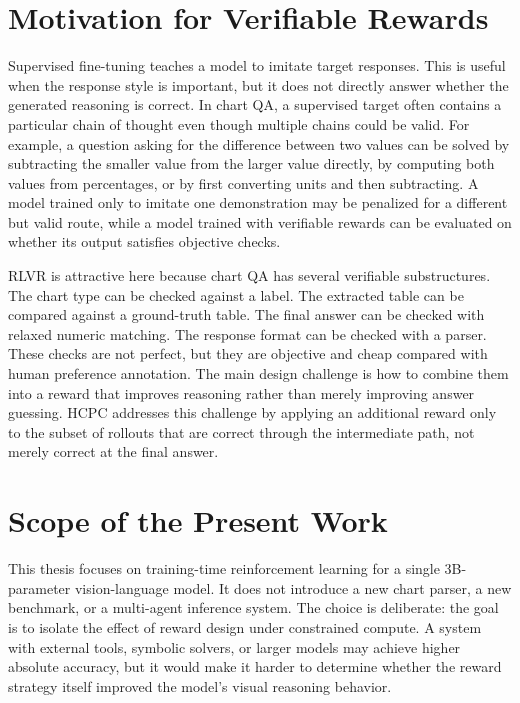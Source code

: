 \documentclass{iutbscthesis}
\begin{document}
\section{Motivation for Verifiable Rewards}

Supervised fine-tuning teaches a model to imitate target responses. This is useful when the response style is important, but it does not directly answer whether the generated reasoning is correct. In chart QA, a supervised target often contains a particular chain of thought even though multiple chains could be valid. For example, a question asking for the difference between two values can be solved by subtracting the smaller value from the larger value directly, by computing both values from percentages, or by first converting units and then subtracting. A model trained only to imitate one demonstration may be penalized for a different but valid route, while a model trained with verifiable rewards can be evaluated on whether its output satisfies objective checks.

RLVR is attractive here because chart QA has several verifiable substructures. The chart type can be checked against a label. The extracted table can be compared against a ground-truth table. The final answer can be checked with relaxed numeric matching. The response format can be checked with a parser. These checks are not perfect, but they are objective and cheap compared with human preference annotation. The main design challenge is how to combine them into a reward that improves reasoning rather than merely improving answer guessing. HCPC addresses this challenge by applying an additional reward only to the subset of rollouts that are correct through the intermediate path, not merely correct at the final answer.

\section{Scope of the Present Work}

This thesis focuses on training-time reinforcement learning for a single 3B-parameter vision-language model. It does not introduce a new chart parser, a new benchmark, or a multi-agent inference system. The choice is deliberate: the goal is to isolate the effect of reward design under constrained compute. A system with external tools, symbolic solvers, or larger models may achieve higher absolute accuracy, but it would make it harder to determine whether the reward strategy itself improved the model's visual reasoning behavior.
\end{document}
